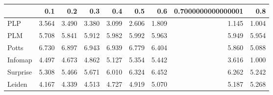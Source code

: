 \begin{tabular}{lrrrrrrrr}
\toprule
{} &   0.1 &   0.2 &   0.3 &   0.4 &   0.5 &   0.6 & 0.7000000000000001 &   0.8 \\
\midrule
PLP      & 3.564 & 3.490 & 3.380 & 3.099 & 2.606 & 1.809 &              1.145 & 1.004 \\
PLM      & 5.708 & 5.841 & 5.912 & 5.982 & 5.992 & 5.963 &              5.949 & 5.954 \\
Potts    & 6.730 & 6.897 & 6.943 & 6.939 & 6.779 & 6.404 &              5.860 & 5.088 \\
Infomap  & 4.497 & 4.673 & 4.862 & 5.127 & 5.354 & 5.442 &              3.616 & 1.000 \\
Surprise & 5.308 & 5.466 & 5.671 & 6.010 & 6.324 & 6.452 &              6.262 & 5.242 \\
Leiden   & 4.167 & 4.339 & 4.513 & 4.727 & 4.919 & 5.070 &              5.187 & 5.268 \\
\bottomrule
\end{tabular}
